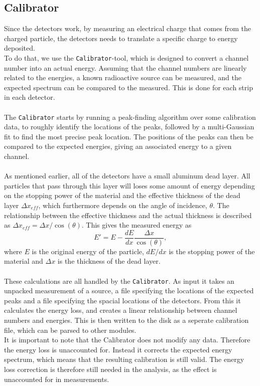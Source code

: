 \subsection{Calibrator}
Since the detectors work, by measuring an electrical charge that comes from the charged particle, the detectors needs to translate a specific charge to energy deposited. \\
To do that, we use the \texttt{Calibrator}-tool, which is designed to convert a channel number into an actual energy. Assuming that the channel numbers are linearly related to the energies, a known radioactive source can be measured, and the expected spectrum can be compared to the measured. This is done for each strip in each detector.
\\
\\
The \texttt{Calibrator} starts by running a peak-finding algorithm over some calibration data, to roughly identify the locations of the peaks, followed by a multi-Gaussian fit to find the most precise peak location. 
The positions of the peaks can then be compared to the expected energies, giving an associated energy to a given channel. \\
\\
As mentioned earlier, all of the detectors have a small aluminum dead layer. All particles that pass through this layer will loses some amount of energy depending on the stopping power of the material and the effective thickness of the dead layer $\Delta x_{eff}$, which furthermore depends on the angle of incidence, $\theta$. 
The relationship between the effective thickness and the actual thickness is described as $\Delta x_{eff} = \Delta x/ \cos(\theta)$. This gives the measured energy as 
\begin{equation*}
E' = E - \dfrac{dE}{dx} \dfrac{\Delta x}{\cos(\theta)},
\end{equation*}
where $E$ is the original energy of the particle, $dE/dx$ is the stopping power of the material and $\Delta x$ is the thickness of the dead layer. \\
\\
These calculations are all handled by the \texttt{Calibrator}. 
As input it takes an unpacked measurement of a source, a file specifying the locations of the expected peaks and a file specifying the spacial locations of the detectors. 
From this it calculates the energy loss, and creates a linear relationship between channel numbers and energies. This is then written to the disk as a seperate calibration file, which can be parsed to other modules.\\
It is important to note that the Calibrator does not modify any data. Therefore the energy loss is unaccounted for. Instead it corrects the expected energy spectrum, which means that the resulting calibration is still valid. The energy loss correction is therefore still needed in the analysis, as the effect is unaccounted for in measurements. 



